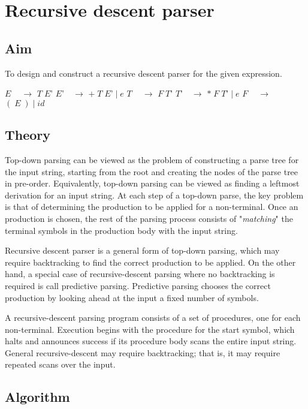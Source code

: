 

\clearpage
\chapter{Recursive descent parser}

\section{Aim}
To design and construct a recursive descent parser for the given expression.
\begin{algorithmic}[1]
	\State $E\: \quad \rightarrow$ $T \; E’$
	\State $E’  \quad \rightarrow$ $+ \; T \; E’ \; | \; e$
	\State $T\: \quad \rightarrow$ $F \; T’$
	\State $T’  \quad \rightarrow$ $* \; F \; T’ \; | \; e$
	\State $F\: \quad \rightarrow$ $( \; E \; ) \; | \; id$
\end{algorithmic}




\section{Theory}
Top-down parsing can be viewed as the problem of constructing a parse tree for the input string, starting from the root and creating the nodes of the parse tree in pre-order. Equivalently, top-down parsing can be viewed as finding a leftmost derivation for an input string. At each step of a top-down parse, the key problem is that of determining
the production to be applied for a non-terminal. Once an production is chosen, the rest of the parsing process consists of "\textit{matching}" the terminal symbols in the production body with the input string.


Recursive descent parser is a general form of top-down parsing, which may require backtracking to find the correct production to be applied. On the other hand, a special case of recursive-descent parsing where no backtracking is required is call predictive parsing. Predictive parsing
chooses the correct production by looking ahead at the input a fixed number
of symbols.

A recursive-descent parsing program consists of a set of procedures, one for each
non-terminal. Execution begins with the procedure for the start symbol, which halts and announces success if its procedure body scans the entire input string.
General recursive-descent may require backtracking; that is, it may require
repeated scans over the input.

\section{Algorithm}

